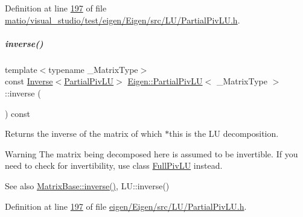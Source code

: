 Definition at line \hyperlink{matio_2visual__studio_2test_2eigen_2_eigen_2src_2_l_u_2_partial_piv_l_u_8h_source_l00197}{197} of file \hyperlink{matio_2visual__studio_2test_2eigen_2_eigen_2src_2_l_u_2_partial_piv_l_u_8h_source}{matio/visual\+\_\+studio/test/eigen/\+Eigen/src/\+L\+U/\+Partial\+Piv\+L\+U.\+h}.

\mbox{\label{group___l_u___module_aef983470f92aba829e861e32e68681b5}} 
\subparagraph{\texorpdfstring{inverse()}{inverse()}\hspace{0.1cm}{\footnotesize\ttfamily [2/2]}}
{\footnotesize\ttfamily template$<$typename \+\_\+\+Matrix\+Type$>$ \\
const \hyperlink{class_eigen_1_1_inverse}{Inverse}$<$\hyperlink{group___l_u___module_class_eigen_1_1_partial_piv_l_u}{Partial\+Piv\+LU}$>$ \hyperlink{group___l_u___module_class_eigen_1_1_partial_piv_l_u}{Eigen\+::\+Partial\+Piv\+LU}$<$ \+\_\+\+Matrix\+Type $>$\+::inverse (\begin{DoxyParamCaption}{ }\end{DoxyParamCaption}) const\hspace{0.3cm}{\ttfamily [inline]}}

\begin{DoxyReturn}{Returns}
the inverse of the matrix of which $\ast$this is the LU decomposition.
\end{DoxyReturn}
\begin{DoxyWarning}{Warning}
The matrix being decomposed here is assumed to be invertible. If you need to check for invertibility, use class \hyperlink{group___l_u___module_class_eigen_1_1_full_piv_l_u}{Full\+Piv\+LU} instead.
\end{DoxyWarning}
\begin{DoxySeeAlso}{See also}
\hyperlink{group___core___module_a7712eb69e8ea3c8f7b8da1c44dbdeebf}{Matrix\+Base\+::inverse()}, L\+U\+::inverse() 
\end{DoxySeeAlso}


Definition at line \hyperlink{eigen_2_eigen_2src_2_l_u_2_partial_piv_l_u_8h_source_l00197}{197} of file \hyperlink{eigen_2_eigen_2src_2_l_u_2_partial_piv_l_u_8h_source}{eigen/\+Eigen/src/\+L\+U/\+Partial\+Piv\+L\+U.\+h}.

